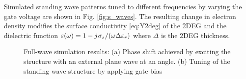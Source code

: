 \documentclass[11pt]{article}
\begin{document}
%
%
Simulated standing wave patterns tuned to different frequencies by varying the gate voltage are shown in Fig. \ref{fig:s_waves}. The resulting change in electron density modifies the surface conductivity \eqref{eq:Y2deg} of the 2DEG and the dielectric function $\varepsilon(\omega) = 1 - j\mkern1mu \sigma_s /(\omega \Delta \varepsilon_r)$ where $\Delta$ is the 2DEG thickness.
%
\begin{figure}[t!]
      \hfil
  \caption{Full-wave simulation results: (a) Phase shift achieved by exciting the structure with an external plane wave at an angle. (b) Tuning of the standing wave structure by applying gate bias}
  \label{fig:simulation1}
\end{figure}
%
\end{document}
